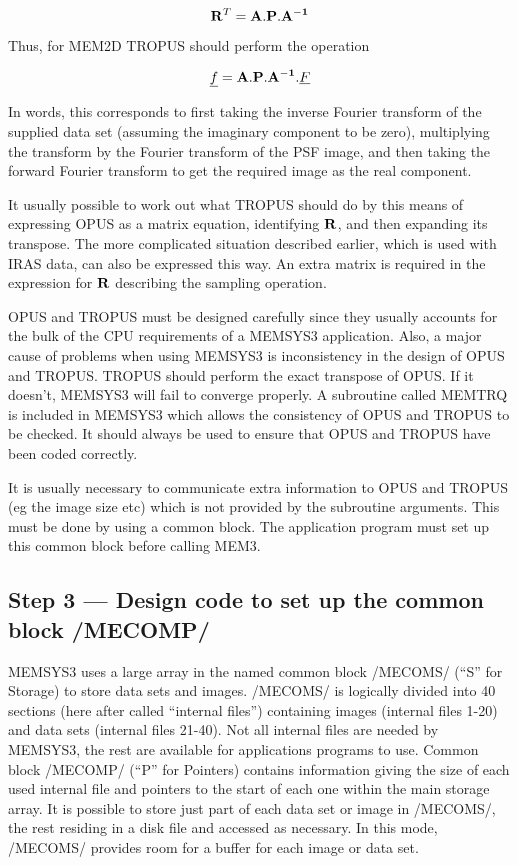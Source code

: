 \begin {equation}
{\bf R}^{T}={\bf A}.{\bf P}.{\bf A^{-1}}
\end {equation}

Thus, for MEM2D TROPUS should perform the operation

\begin {equation}
\underline{f}={\bf A}.{\bf P}.{\bf A^{-1}}.\underline{F}
\end {equation}

In words, this corresponds to first taking the inverse Fourier transform of the 
supplied data set (assuming the imaginary component to be zero), multiplying
the  transform by the Fourier transform of the PSF image, and then taking the
forward Fourier transform to get the required image as the  real component.

It usually possible to work out what TROPUS should do by this means of 
expressing OPUS as a matrix equation, identifying ${\bf R}$, and then expanding 
its transpose. The more complicated situation described earlier, which is  used
with IRAS data, can also be expressed this way. An extra matrix is required  in
the expression for ${\bf R}$ describing the sampling operation.

OPUS and TROPUS must be designed carefully since they usually accounts for the
bulk of the CPU requirements of a MEMSYS3 application. Also, a major cause of
problems when using MEMSYS3 is inconsistency in the design of OPUS and TROPUS.
TROPUS should perform the exact transpose of OPUS. If it
doesn't, MEMSYS3 will fail to converge properly. A subroutine called MEMTRQ is
included in MEMSYS3 which allows the consistency of OPUS and TROPUS to be
checked. It should always be used to ensure that OPUS and TROPUS have been coded
correctly. 

It is usually necessary to communicate extra information to OPUS and TROPUS (eg
the image size etc) which is not provided by the subroutine arguments. This must
be done by using a common block. The application program must set up this common
block before calling MEM3. 

\subsection {Step 3 --- Design code to set up the common block /MECOMP/}

MEMSYS3 uses a large array in the named common block /MECOMS/ (``S'' for
Storage) to store data sets and images. /MECOMS/ is logically divided into 40
sections (here after called ``internal files'') containing images (internal
files 1-20) and data sets (internal files 21-40). Not all internal files are
needed by MEMSYS3, the rest are available for applications programs to use.
Common block /MECOMP/ (``P'' for Pointers) contains information giving the size
of each used internal file and pointers to the start of each one within the main
storage array. It is possible to store just part of each data set or image in
/MECOMS/, the rest residing in a disk file and accessed as necessary. In this
mode, /MECOMS/ provides room for a buffer for each image or data set. 

